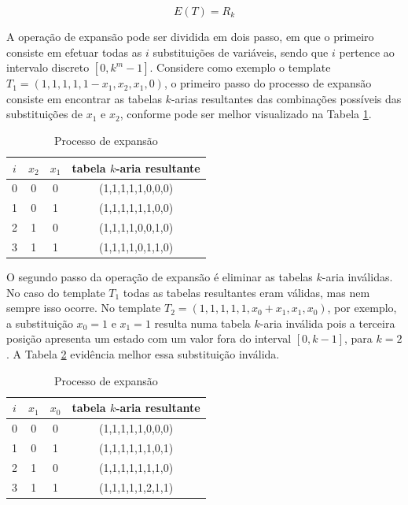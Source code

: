\documentclass[12pt,a4paper]{article}
\begin{document}
	\begin{equation}
	E(T)=R_k
	\end{equation}

	A operação de expansão pode ser dividida em dois passo, em que o primeiro consiste em efetuar todas as $i$ substituições de variáveis, sendo que $i$ pertence ao intervalo discreto $[0,k^m-1]$. Considere como exemplo o template $T_1 = (1,1,1,1,1-x_1,x_2,x_1,0)$, o primeiro passo do processo de expansão consiste em encontrar as tabelas $k$-arias resultantes das combinações possíveis das substituições de $x_1$ e $x_2$, conforme pode ser melhor visualizado na Tabela \ref{tab:expansionProcess}.

	\begin{table}[h!]
	\centering
	\caption{Processo de expansão}
	{
		\vspace{0.3cm}
		\begin{tabular}{cccc}
		\hline
		$i$ & $x_2$ & $x_1$ & tabela $k$-aria resultante \\
		\hline
		0	&	0	&	0	&	(1,1,1,1,1,0,0,0)	\\
		1	&	0	&	1	&	(1,1,1,1,1,1,0,0)	\\
		2	&	1	&	0	&	(1,1,1,1,0,0,1,0)	\\
		3	&	1	&	1	&	(1,1,1,1,0,1,1,0)	\\
		\hline
		\end{tabular}
	}
	\label{tab:expansionProcess}
	\end{table}

	O segundo passo da operação de expansão é eliminar as tabelas $k$-aria inválidas. No caso do template $T_1$ todas as tabelas resultantes eram válidas, mas nem sempre isso ocorre. No template $T_2 = (1,1,1,1,1,x_0+x_1,x_1,x_0)$, por exemplo, a substituição $x_0 = 1$ e $x_1 = 1$ resulta numa tabela $k$-aria inválida pois a terceira posição apresenta um estado com um valor fora do interval $[0,k-1]$, para $k=2$. A Tabela \ref{tab:invalideExpansion} evidência melhor essa substituição inválida.

	\begin{table}[h!]
	\centering
	\caption{Processo de expansão}
	{
		\vspace{0.3cm}
		\begin{tabular}{cccc}
		\hline
		$i$ & $x_1$ & $x_0$ & tabela $k$-aria resultante \\
		\hline
		0	&	0	&	0	&	(1,1,1,1,1,0,0,0)	\\
		1	&	0	&	1	&	(1,1,1,1,1,1,0,1)	\\
		2	&	1	&	0	&	(1,1,1,1,1,1,1,0)	\\
		3	&	1	&	1	&	(1,1,1,1,1,2,1,1)	\\
		\hline
		\end{tabular}
	}
	\label{tab:invalideExpansion}
	\end{table}
\end{document}
